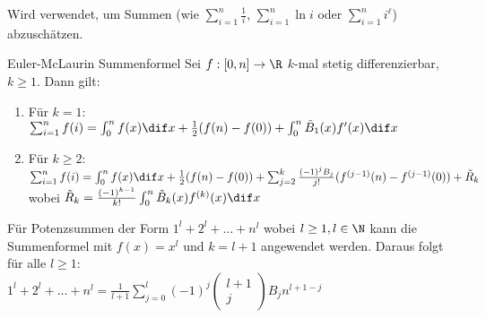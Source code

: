 
Wird verwendet, um Summen (wie $\sum_{i=1}^n \frac{1}{i}$, $\sum_{i=1}^n \ln{i}$ oder $\sum_{i=1}^n i^\ell$) abzuschätzen.
\begin{theorem}[important]{Euler-McLaurin Summenformel}
	Sei $f : [0,n] \to \R$ $k$-mal stetig differenzierbar, $k \geq 1$.
	Dann gilt:
	\begin{enumerate}
		\item Für $k=1$:\\ $\sum^{n}_{i=1} f(i) = \int_{0}^{n} f(x) \dif x + \frac{1}{2} ( f(n) - f(0) ) + \int_{0}^{n} \tilde{B}_1 (x) f'(x) \dif x$
		\item Für $k \geq 2$:\\ $\sum^{n}_{i=1} f(i)\\ = \int_{0}^{n} f(x) \dif x + \frac{1}{2} ( f(n) - f(0) )\\
						     + \sum^{k}_{j=2} \frac{(-1)^j B_j}{j!} ( f^{(j-1)} (n) - f^{(j-1)} (0) ) + \tilde{R}_k$\\
			wobei $\tilde{R}_k = \frac{(-1)^{k-1}}{k!} \int_{0}^{n} \tilde{B}_k (x) f^{(k)} (x) \dif x$
	\end{enumerate}
\end{theorem}



\begin{highlight}{\impemph{!}}
	Für Potenzsummen der Form $1^l + 2^l + \ldots + n^l$ wobei $l \geq 1, l \in \N$ kann die Summenformel mit $f(x) = x^l$ und $k=l+1$ angewendet werden.
	Daraus folgt für alle $l \geq 1$:\\
    $1^l + 2^l + \ldots + n^l = \frac{1}{l+1} \sum^{l}_{j=0} (-1)^j \begin{pmatrix}l+1\\j\end{pmatrix} B_j n^{l+1-j}$

\end{highlight}







